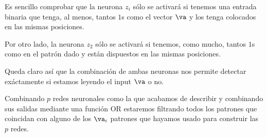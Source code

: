 \begin{problem}[17]
Es sencillo comprobar que la neurona $z_i$ sólo se activará si tenemos una entrada binaria que tenga, al menos, tantos $1$s como el vector $\va$ y los tenga colocados en las mismas posiciones.

Por otro lado, la neurona $z_2$ sólo se activará si tenemos, como mucho, tantos $1$s como en el patrón dado y están dispuestos en las mismas posiciones.

Queda claro así que la combinación de ambas neuronas nos permite detectar exáctamente si estamos leyendo el input $\va$ o no.

Combinando $p$ redes neuronales como la que acabamos de describir y combinando sus salidas mediante una función OR estaremos filtrando todos los patrones que coincidan con alguno de los $\va_i$ patrones que hayamos usado para construir las $p$ redes.
\end{problem}

